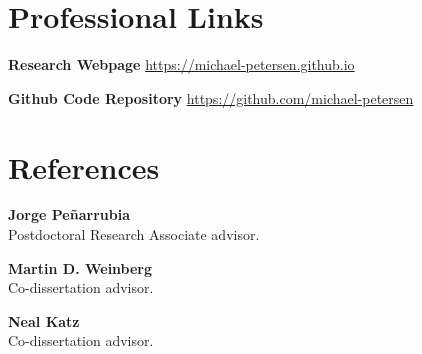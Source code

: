 \documentclass[margin, 11pt]{res} %
\begin{document}
\begin{resume}

\section{\sc \textcolor{redshade}{Professional Links}}
{\bf Research Webpage} \url{https://michael-petersen.github.io}

{\bf Github Code Repository} \url{https://github.com/michael-petersen}


\section{\sc \textcolor{redshade}{References}}

{\bf Jorge Pe{\~n}arrubia}\\
Postdoctoral Research Associate advisor.

{\bf Martin D. Weinberg}\\
Co-dissertation advisor.

{\bf Neal Katz}\\
Co-dissertation advisor.


\end{resume}
\end{document}
